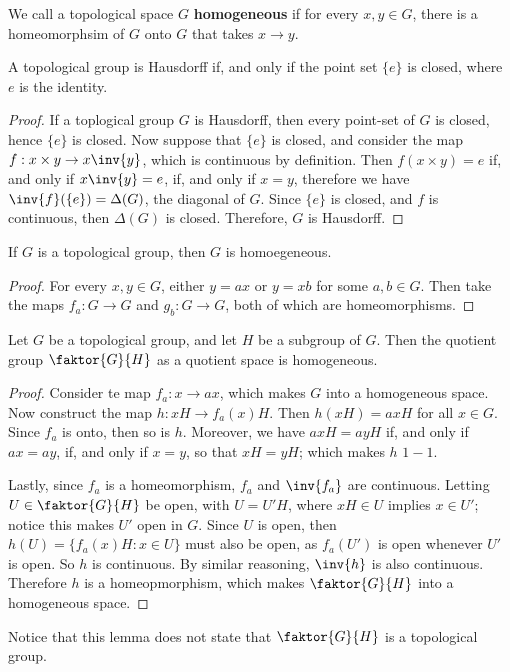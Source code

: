 \begin{definition}
    We call a topological space $G$ \textbf{homogeneous} if for every $x,y \in
    G$, there is a homeomorphsim of $G$ onto  $G$ that takes  $x \rightarrow
    y$.
\end{definition}

\begin{lemma}\label{2.5.5}
    A topological group is Hausdorff if, and only if the point set $\{e\}$ is
    closed, where $e$ is the identity.
\end{lemma}
\begin{proof}
    If a toplogical group $G$ is Hausdorff, then every point-set of $G$ is
    closed, hence  $\{e\}$ is closed. Now suppose that $\{e\}$ is closed, and
    consider the map $f:x \times y \rightarrow x\inv{y}$, which is continuous by
    definition. Then $f(x \times y)=e$ if, and only if $x\inv{y}=e$, if, and
    only if $x=y$, therefore we have  $\inv{f}(\{e\})=\Delta(G)$, the diagonal
    of $G$. Since  $\{e\}$ is closed, and $f$ is continuous, then  $\Delta(G)$
    is closed. Therefore, $G$ is Hausdorff.
\end{proof}

\begin{lemma}\label{2.5.6}
    If $G$ is a topological group, then  $G$ is homoegeneous.
\end{lemma}
\begin{proof}
    For every $x,y \in G$, either  $y=ax$ or  $y=xb$ for some  $a,b \in G$. Then
    take the maps  $f_a:G \rightarrow G$ and  $g_b:G \rightarrow G$, both of
    which are homeomorphisms.
\end{proof}

\begin{lemma}\label{2.5.7}
    Let $G$ be a topological group, and let  $H$ be a subgroup of  $G$. Then the
    quotient group $\faktor{G}{H}$ as a quotient space is homogeneous.
\end{lemma}
\begin{proof}
    Consider te map $f_a:x \rightarrow ax$, which makes $G$ into a homogeneous
    space. Now construct the map  $h:xH \rightarrow f_a(x)H$. Then $h(xH)=axH$
    for all $x \in G$. Since $f_a$ is onto, then so is $h$. Moreover, we have
    $axH=ayH$ if, and only if  $ax=ay$, if, and only if  $x=y$, so that
    $xH=yH$; which makes  $h$  $1-1$.

    Lastly, since  $f_a$ is a homeomorphism,  $f_a$ and  $\inv{f_a}$ are
    continuous. Letting $U \in \faktor{G}{H}$ be open, with $U=U'H$, where  $xH
    \in U$ implies  $x \in U'$; notice this makes $U'$ open in  $G$. Since $U$
    is open, then  $h(U)=\{f_a(x)H : x \in U\}$ must also be open, as $f_a(U')$
    is open whenever $U'$ is open. So $h$ is continuous. By similar reasoning,
    $\inv{h}$ is also continuous. Therefore $h$ is a homeopmorphism, which makes
     $\faktor{G}{H}$ into a homogeneous space.
\end{proof}
\begin{remark}
    Notice that this lemma does not state that $\faktor{G}{H}$ is a topological
    group.
\end{remark}

